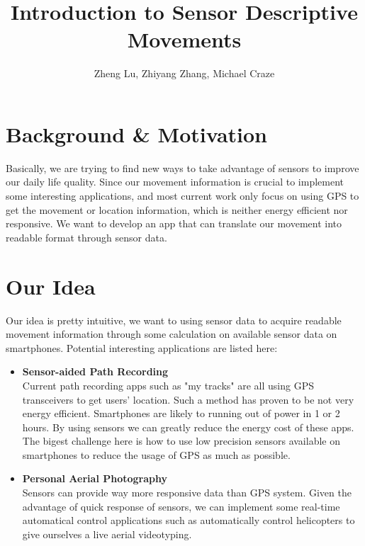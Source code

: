 \documentclass {article}
\begin{document}
\title {Introduction to Sensor Descriptive Movements}
\author {Zheng Lu, Zhiyang Zhang, Michael Craze}
\maketitle

\section {Background \& Motivation}

Basically, we are trying to find new ways to take advantage of sensors to improve our daily life quality. Since our movement information is crucial to implement some interesting applications, and most current work only focus on using GPS to get the movement or location information, which is neither energy efficient nor responsive. We want to develop an app that can translate our movement into readable format through sensor data.

\section {Our Idea}

Our idea is pretty intuitive,  we want to using sensor data to acquire readable movement information through some calculation on available sensor data on smartphones.
Potential interesting applications are listed here:

\begin {itemize}
	\item \textbf {Sensor-aided Path Recording} \\
		Current path recording apps such as "my tracks" are all using GPS transceivers to get users' location. Such a method has proven to be not very energy efficient. Smartphones are likely to running out of power in 1 or 2 hours. By using sensors we can greatly reduce the energy cost of these apps. The bigest challenge here is how to use low precision sensors available on smartphones to reduce the usage of GPS as much as possible.
	\item \textbf {Personal Aerial Photography} \\
		Sensors can provide way more responsive data than GPS system. Given the advantage of quick response of sensors, we can implement some real-time automatical control applications such as automatically control helicopters to give ourselves a live aerial videotyping.
\end {itemize}
\end{document}
